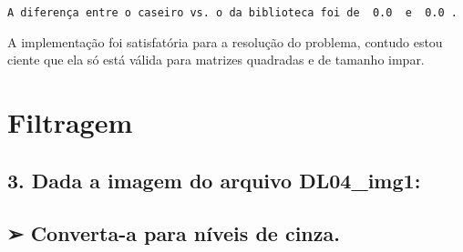 \documentclass[11pt]{article}
\begin{document}
    \begin{Verbatim}[commandchars=\\\{\}]
A diferença entre o caseiro vs. o da biblioteca foi de  0.0  e  0.0 .

    \end{Verbatim}

    A implementação foi satisfatória para a resolução do problema, contudo
estou ciente que ela só está válida para matrizes quadradas e de tamanho
impar.

    \hypertarget{filtragem}{%
\section{Filtragem}\label{filtragem}}

\hypertarget{dada-a-imagem-do-arquivo-dl04_img1}{%
\subsection{\texorpdfstring{3. Dada a imagem do arquivo DL04\_img1:
}{3. Dada a imagem do arquivo DL04\_img1:  }}\label{dada-a-imagem-do-arquivo-dl04_img1}}

\hypertarget{converta-a-para-nuxedveis-de-cinza.}{%
\subsection{\texorpdfstring{➢ Converta-a para níveis de cinza.
}{➢ Converta-a para níveis de cinza.  }}\label{converta-a-para-nuxedveis-de-cinza.}}
\end{document}

